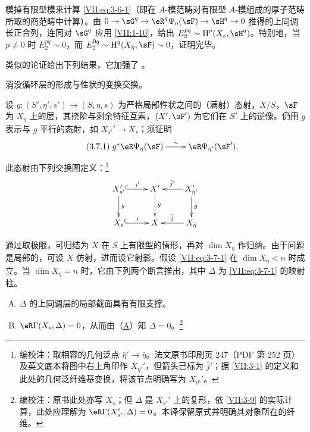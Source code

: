 模掉有限型模来计算 \eqref{VII:eq:3-6-1}（即在 $A$-模范畴对有限型 $A$-模组成的厚子范畴所取的商范畴中计算）。由 $0 \to \sG^q \to \eR^q\Psi_\eta(\sF) \to \sH^q \to 0$ 推得的上同调长正合列，连同对 $\sG^q$ 应用 \ref{VII:1-10}，给出 $E_2^{p q} \sim \h^p(X_s,\sH^q)$。特别地，当 $p\ne 0$ 时 $E_2^{p q}\sim 0$，而 $E_2^{0 q}\sim \h^q(X_{\bar\eta},\sF) \sim 0$，证明完毕。

类似的论证给出下列结果，它加强了 \cite[XIII 2.1.12, 2.4.2]{sga7}。

\begin{proposition_}\label{VII:3-7}
消没循环层的形成与性状的变换交换。
\end{proposition_}

设 $g:(S',\eta',s') \to (S,\eta,s)$ 为严格局部性状之间的（满射）态射，$X/S$，$\sF$ 为 $X_\eta$ 上的层，其挠阶与剩余特征互素，$(X',\sF')$ 为它们在 $S'$ 上的逆像。仍用 $g$ 表示与 $g$ 平行的态射，如 $X_{s'}' \to X_s$；须证明
\begin{equation*}\tag{3.7.1}\label{VII:eq:3-7-1}
\xymatrix{
  g^\ast \eR\Psi_\eta(\sF) \ar[r]^-\sim
    & \eR\Psi_{\eta'}(\sF') \text{.}
}
\end{equation*}
此态射由下列交换图定义：\footnote{编校注：取相容的几何泛点 $\bar\eta'\to\bar\eta$。法文原书印刷页 247（PDF 第 252 页）及英文底本将图中右上角印作 $X_{\eta'}'$，但箭头已标为 $\bar j'$；据 \ref{VII:3-1} 的定义和此处的几何泛纤维基变换，将该节点明确写为 $X_{\bar\eta'}'$。}
\[\xymatrix{
  X_{s'}' \ar@{^{(}->}[r]^-{i'} \ar[d]^-g
    & X' \ar[d]^-g
    & X_{\bar\eta'}' \ar[l]_-{\bar j'} \ar[d]^-g \\
  X_s \ar@{^{(}->}[r]^-i
    & X
    & \ar[l]_-{\bar j} X_{\bar\eta}
}\]

通过取极限，可归结为 $X$ 在 $S$ 上有限型的情形，再对 $\dim{X_\eta}$ 作归纳。由于问题是局部的，可设 $X$ 仿射，进而设它射影。假设 \eqref{VII:eq:3-7-1} 在 $\dim{X_\eta}<n$ 时成立。当 $\dim{X_\eta}=n$ 时，它由下列两个断言推出，其中 $\Delta$ 为 \eqref{VII:eq:3-7-1} 的映射柱。
\begin{enumerate}[(A)]
  \item $\Delta$ 的上同调层的局部截面具有有限支撑。
    \hypertarget{VII:3-A}{}
  \item $\eR\Gamma(X_s,\Delta)=0$，从而由（\hyperlink{VII:3-A}{A}）知 $\Delta=0$。\footnote{编校注：原书此处亦写 $X_s$；但 $\Delta$ 是 $X_{s'}'$ 上的复形，依 \ref{VII:3-9} 的实际计算，此处应理解为 $\eR\Gamma(X_{s'}',\Delta)=0$。本译保留原式并明确其对象所在的纤维。}
    \hypertarget{VII:3-B}{}
\end{enumerate}

